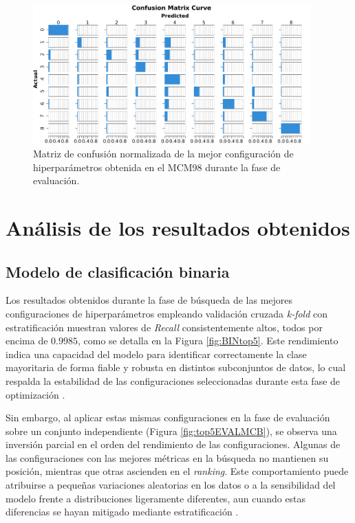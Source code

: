 \begin{figure}[H]
    \centering
    \includegraphics[width=0.95\textwidth]{./img/evaluacion/matrices_confusion/MCNorm_EVAL_MCM98.pdf}
    \caption{Matriz de confusión normalizada de la mejor configuración de hiperparámetros obtenida en el MCM98 durante la fase de evaluación.}
    \label{fig:MCNorm_EVAL_MCM98}
\end{figure}




\section{Análisis de los resultados obtenidos} \label{sec:analEVAL}
\subsection{Modelo de clasificación binaria}

Los resultados obtenidos durante la fase de búsqueda de las mejores configuraciones de hiperparámetros empleando validación cruzada \textit{k-fold} con estratificación muestran valores de \textit{Recall} consistentemente altos, todos por encima de $0{.}9985$, como se detalla en la Figura \ref{fig:BINtop5}. Este rendimiento indica una capacidad del modelo para identificar correctamente la clase mayoritaria de forma fiable y robusta en distintos subconjuntos de datos, lo cual respalda la estabilidad de las configuraciones seleccionadas durante esta fase de optimización \cite{bergstra2012random}.

Sin embargo, al aplicar estas mismas configuraciones en la fase de evaluación sobre un conjunto independiente (Figura \ref{fig:top5EVALMCB}), se observa una inversión parcial en el orden del rendimiento de las configuraciones. Algunas de las configuraciones con las mejores métricas en la búsqueda no mantienen su posición, mientras que otras ascienden en el \textit{ranking}. Este comportamiento puede atribuirse a pequeñas variaciones aleatorias en los datos o a la sensibilidad del modelo frente a distribuciones ligeramente diferentes, aun cuando estas diferencias se hayan mitigado mediante estratificación \cite{reimers2017optimal}.

